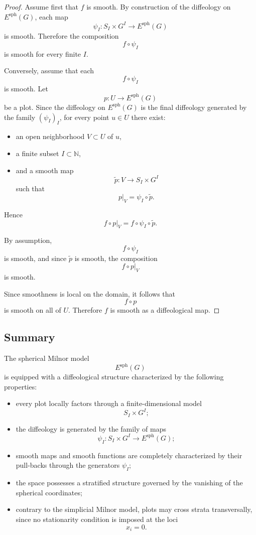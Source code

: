 \documentclass[11pt]{amsart}
\begin{document}
\begin{proof}
Assume first that \(f\) is smooth. By construction of the diffeology on
\(E^{\mathrm{sph}}(G)\), each map
\[
\psi_I:S_I\times G^I\to E^{\mathrm{sph}}(G)
\]
is smooth. Therefore the composition
\[
f\circ\psi_I
\]
is smooth for every finite \(I\).

Conversely, assume that each
\[
f\circ\psi_I
\]
is smooth. Let
\[
p:U\to E^{\mathrm{sph}}(G)
\]
be a plot. Since the diffeology on \(E^{\mathrm{sph}}(G)\) is the final
diffeology generated by the family \((\psi_I)_I\), for every point
\(u\in U\) there exist:
\begin{itemize}
\item an open neighborhood \(V\subset U\) of \(u\),
\item a finite subset \(I\subset\mathbb N\),
\item and a smooth map
\[
\widetilde p:V\to S_I\times G^I
\]
such that
\[
p|_V=\psi_I\circ\widetilde p.
\]
\end{itemize}

Hence
\[
f\circ p|_V
=
f\circ\psi_I\circ\widetilde p.
\]

By assumption,
\[
f\circ\psi_I
\]
is smooth, and since \(\widetilde p\) is smooth, the composition
\[
f\circ p|_V
\]
is smooth.

Since smoothness is local on the domain, it follows that
\[
f\circ p
\]
is smooth on all of \(U\). Therefore \(f\) is smooth as a diffeological map.
\end{proof}

\subsection{Summary}

The spherical Milnor model
\[
E^{\mathrm{sph}}(G)
\]
is equipped with a diffeological structure characterized by the following
properties:
\begin{itemize}
\item every plot locally factors through a finite-dimensional model
\[
S_I\times G^I;
\]
\item the diffeology is generated by the family of maps
\[
\psi_I:S_I\times G^I\to E^{\mathrm{sph}}(G);
\]
\item smooth maps and smooth functions are completely characterized by their
pull-backs through the generators \(\psi_I\);
\item the space possesses a stratified structure governed by the vanishing of
the spherical coordinates;
\item contrary to the simplicial Milnor model, plots may cross strata
transversally, since no stationarity condition is imposed at the loci
\[
x_i=0.
\]
\end{itemize}
\end{document}
